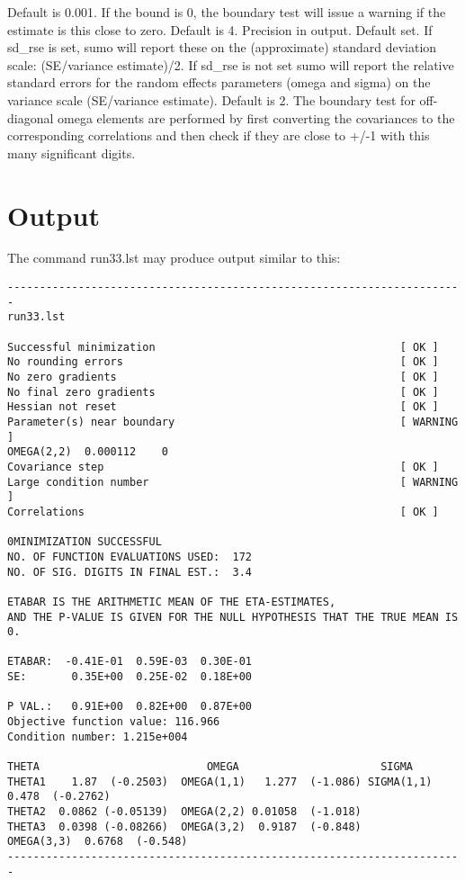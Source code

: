 \begin{optionlist}
\nextopt
{}
Default is 0.001. If the bound is 0, the boundary test will issue a warning if the estimate is this close to zero. 
\nextopt
{}
Default is 4. Precision in output.  
\nextopt
{}
Default set. If sd\_rse is set, sumo will report these on the (approximate) standard deviation scale: (SE/variance estimate)/2. If sd\_rse is not set sumo will report the relative standard errors for the random effects parameters (omega and sigma) on the variance scale (SE/variance estimate).
\nextopt
{}
Default is 2. The boundary test for off-diagonal omega elements are performed by first converting the covariances to the corresponding correlations and then check if they are close to +/-1 with this many significant digits.  
\nextopt
\end{optionlist}

\section{Output}
The command run33.lst may produce output similar to this:
\begin{verbatim}
-----------------------------------------------------------------------
run33.lst

Successful minimization                                      [ OK ]   
No rounding errors                                           [ OK ]   
No zero gradients                                            [ OK ]   
No final zero gradients                                      [ OK ]   
Hessian not reset                                            [ OK ]   
Parameter(s) near boundary                                   [ WARNING ]   
OMEGA(2,2)	0.000112	0
Covariance step                                              [ OK ]   
Large condition number                                       [ WARNING ]   
Correlations                                                 [ OK ]

0MINIMIZATION SUCCESSFUL
NO. OF FUNCTION EVALUATIONS USED:  172
NO. OF SIG. DIGITS IN FINAL EST.:  3.4

ETABAR IS THE ARITHMETIC MEAN OF THE ETA-ESTIMATES,
AND THE P-VALUE IS GIVEN FOR THE NULL HYPOTHESIS THAT THE TRUE MEAN IS 0.

ETABAR:  -0.41E-01  0.59E-03  0.30E-01
SE:       0.35E+00  0.25E-02  0.18E+00

P VAL.:   0.91E+00  0.82E+00  0.87E+00
Objective function value: 116.966
Condition number: 1.215e+004

THETA                          OMEGA                      SIGMA            
THETA1    1.87  (-0.2503)  OMEGA(1,1)   1.277  (-1.086) SIGMA(1,1) 0.478  (-0.2762) 
THETA2  0.0862 (-0.05139)  OMEGA(2,2) 0.01058  (-1.018)                                
THETA3  0.0398 (-0.08266)  OMEGA(3,2)  0.9187  (-0.848)
OMEGA(3,3)  0.6768  (-0.548)
-----------------------------------------------------------------------
\end{verbatim}

